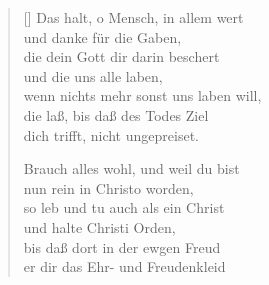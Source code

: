 \begin{multicols}{2}
\begin{verse}[\versewidth]
 Das halt, o Mensch, in allem wert\\
und danke für die Gaben,\\
die dein Gott dir darin beschert\\
und die uns alle laben,\\
wenn nichts mehr sonst uns laben will,\\
die laß, bis daß des Todes Ziel\\
dich trifft, nicht ungepreiset.

 Brauch alles wohl, und weil du bist\\
nun rein in Christo worden,\\
so leb und tu auch als ein Christ\\
und halte Christi Orden,\\
bis daß dort in der ewgen Freud\\
er dir das Ehr- und Freudenkleid

\end{verse}
\end{multicols}
